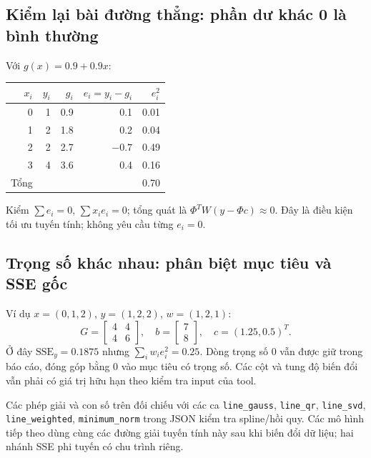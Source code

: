 \subsection{Kiểm lại bài đường thẳng: phần dư khác 0 là bình thường}
Với $g(x)=0.9+0.9x$:
\begin{center}\begin{tabular}{rrrrr}\toprule
$x_i$&$y_i$&$g_i$&$e_i=y_i-g_i$&$e_i^2$\\\midrule
0&1&0.9&0.1&0.01\\1&2&1.8&0.2&0.04\\
2&2&2.7&$-0.7$&0.49\\3&4&3.6&0.4&0.16\\\midrule
Tổng&&&&0.70\\\bottomrule
\end{tabular}\end{center}
Kiểm $\sum e_i=0$, $\sum x_ie_i=0$; tổng quát là $\Phi^TW(y-\Phi c)\approx0$. Đây là điều kiện tối ưu tuyến tính; không yêu cầu từng $e_i=0$.

\subsection{Trọng số khác nhau: phân biệt mục tiêu và SSE gốc}
Ví dụ $x=(0,1,2)$, $y=(1,2,2)$, $w=(1,2,1)$:
\[
G=\begin{bmatrix}4&4\\4&6\end{bmatrix},\quad
b=\begin{bmatrix}7\\8\end{bmatrix},\quad c=(1.25,0.5)^T.
\]
Ở đây $\mathrm{SSE}_y=0.1875$ nhưng $\sum_iw_ie_i^2=0.25$. Dòng trọng số 0 vẫn được giữ trong báo cáo, đóng góp bằng 0 vào mục tiêu có trọng số. Các cột và tung độ biến đổi vẫn phải có giá trị hữu hạn theo kiểm tra input của tool.

Các phép giải và con số trên đối chiếu với các ca \texttt{line\_gauss}, \texttt{line\_qr}, \texttt{line\_svd}, \texttt{line\_weighted}, \texttt{minimum\_norm} trong JSON kiểm tra spline/hồi quy. Các mô hình tiếp theo dùng cùng các đường giải tuyến tính này sau khi biến đổi dữ liệu; hai nhánh SSE phi tuyến có chu trình riêng.

